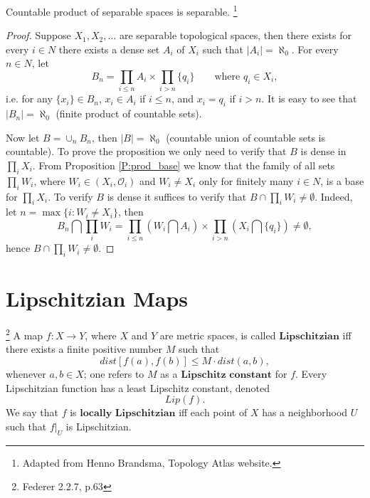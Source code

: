 \begin{proposition} \label{P:prod_sep}
Countable product of separable spaces is separable.
\footnote{Adapted from Henno Brandsma, Topology Atlas website.}
\end{proposition}
\begin{proof}
Suppose $X_1,X_2,\dots$ are separable topological spaces, then there exists
for every $i\in N$ there exists a dense set $A_i$ of $X_i$ such that
$|A_i|=\aleph_0$.
For every $n\in N$, let 
\[
  B_n = \prod_{i\leq n} A_i \times \prod_{i>n} \{q_i\}
      \qquad \text{where $q_i\in X_i$},
\]
i.e. for any $\{x_i\}\in B_n$, $x_i\in A_i$ if $i\leq n$, and $x_i = q_i$ 
if $i>n$. It is easy to see that $|B_n|=\aleph_0$ (finite product of 
countable sets).

Now let $B=\cup_n B_n$, then $|B|=\aleph_0$ (countable union of 
countable sets is countable). To prove the proposition we only need to 
verify that $B$ is dense in $\prod_i X_i$. From Proposition \ref{P:prod_base}
we know that the family of all sets $\prod_i W_i$, where 
$W_i\in (X_i,\mathcal{O}_i)$ and $W_i\neq X_i$ only for finitely many $i\in N$,
is a base for $\prod_i X_i$. To verify $B$ is dense it suffices to verify that
$B\cap \prod_i W_i\neq \emptyset$. Indeed, let $n=\max\{i: W_i\neq X_i\}$, then
\[
  B_n \bigcap \prod_i W_i = \prod_{i\leq n} \left( W_i \bigcap A_i \right)
                     \times \prod_{i>n} \left( X_i \bigcap \{q_i\} \right)
                          \neq \emptyset,
\]
hence $B\cap \prod_i W_i\neq\emptyset$.
\end{proof}












\section{Lipschitzian Maps}

\begin{definition} \label{D:lipschitz}
\footnote{Federer 2.2.7, p.63}
A map $f:X\to Y$, where $X$ and $Y$ are metric spaces, is called
$\textbf{Lipschitzian}$ 
iff there exists a finite positive number $M$ such that
\[
  dist[f(a),f(b)] \leq M \cdot dist(a,b),
\]
whenever $a,b\in X$; one refers to $M$ as a $\textbf{Lipschitz constant}$ for
$f$. Every Lipschitzian function has a least Lipschitz constant, denoted
\[
  Lip(f).
\]
We say that $f$ is $\textbf{locally Lipschitzian}$
iff each point of $X$ has a
neighborhood $U$ such that $f|_U$ is Lipschitzian.
\end{definition}

